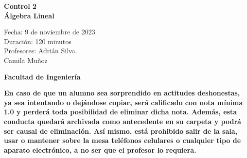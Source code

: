 \documentclass[a4paper]{article}
\begin{document}
\thispagestyle{fancy}
\vspace*{1cm}

\begin{minipage}[r]{12cm}
    \begin{flushright}
    \end{flushright}
\end{minipage}

\begin{center}
\Large{\textbf{Control 2\\ Álgebra Lineal\\ }}
\end{center}
\vspace{1cm}
\begin{minipage}[r]{15cm}
\begin{flushleft}

Fecha: 9 de noviembre de 2023 \\%
Duración: 120 minutos  \\
Profesores: Adrián Silva.\\\hspace{1.7cm} Camila Muñoz\\
\end{flushleft}
\end{minipage}
\vspace{2cm}
\begin{center}
\Large{\textbf{Facultad de Ingeniería}}
\end{center}
\vspace{1cm}
\textbf{En caso de que un alumno sea sorprendido en actitudes deshonestas, ya sea intentando o
dejándose copiar, será calificado con nota mínima 1.0 y perderá toda posibilidad de eliminar
dicha nota. Además, esta conducta quedará archivada como antecedente en su carpeta y
podrá ser causal de eliminación.
Así mismo, está prohibido salir de la sala, usar o mantener sobre la mesa teléfonos celulares
o cualquier tipo de aparato electrónico, a no ser que el profesor lo requiera.}\\



\vspace{5cm}
\newpage
\thispagestyle{empty}
\end{document}
